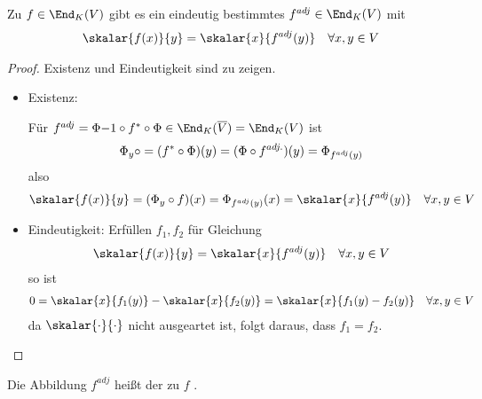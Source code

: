 \begin{proposition}
	Zu $f\in\End_K(V)$ gibt es ein eindeutig bestimmtes $f^{adj}\in\End_K(V)$ mit 
	\begin{align}
		\skalar{f(x)}{y}=\skalar{x}{f^{adj}(y)}\quad\forall x,y\in V\notag
	\end{align}
\end{proposition}
\begin{proof}
	Existenz und Eindeutigkeit sind zu zeigen.
	\begin{itemize}
		\item Existenz:
		\begin{center}
		\end{center}
		Für $f^{adj}=\Phi{-1}\circ f^*\circ \Phi\in \End_K(\overline{V})=\End_K(V)$ ist 
		\begin{align}
			\Phi_y\circ = (f^*\circ \Phi)(y)=(\Phi\circ f^{adj.})(y)=\Phi_{f^{adj}(y)}\notag
		\end{align}
		also
		\begin{align}
			\skalar{f(x)}{y}=(\Phi_y\circ f)(x)=\Phi_{f^{adj}(y)}(x)=\skalar{x}{f^{adj}(y)}\quad\forall x,y\in V\notag
		\end{align}
		\item Eindeutigkeit: Erfüllen $f_1,f_2$ für Gleichung
		\begin{align}
			\skalar{f(x)}{y}=\skalar{x}{f^{adj}(y)}\quad\forall x,y\in V\notag
		\end{align}
		so ist
		\begin{align}
			0=\skalar{x}{f_1(y)}-\skalar{x}{f_2(y)}=\skalar{x}{f_1(y)-f_2(y)}\quad\forall x,y\in V\notag
		\end{align}
		da $\skalar{\cdot}{\cdot}$ nicht ausgeartet ist, folgt daraus, dass $f_1=f_2$.
	\end{itemize}
\end{proof}

\begin{definition}
	Die Abbildung $f^{adj}$ heißt der zu $f$ .
\end{definition}

